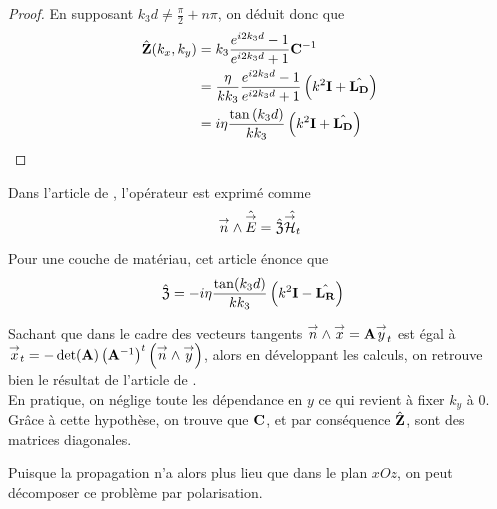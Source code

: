 \begin{proof}
            En supposant \(k_3d \not = \frac{\pi}{2} + n\pi\), on déduit donc que
            \begin{align}
                \hat {\mathbf{Z}}(k_x,k_y) &=  k_3 \dfrac{e^{i2k_3d} -1}{e^{i2k_3d} +1} \mathbf{C}^{-1}
                \\
                &= \dfrac{\eta}{kk_3} \dfrac{e^{i2k_3d} -1}{e^{i2k_3d} +1}\left(k^2\mathbf{I} + \hat{\mathbf{L_D}}\right)
                \\
                &= i\eta\dfrac{\tan\left(k_3d\right)}{kk_3}\left(k^2\mathbf{I} + \hat{\mathbf{L_D}}\right)
            \end{align}

        \end{proof}

        Dans l'article de \cite{marceaux_high-order_2000}, l'opérateur est exprimé comme
        \begin{equation}
            {\overset{\rightarrow}{n}} \wedge \hat{{\overset{\rightarrow}{E}}} = \hat{\mathfrak{Z}} \hat{{\overset{\rightarrow}{\mathcal{H}}}_t}
        \end{equation}

        Pour une couche de matériau, cet article énonce que 
        \begin{align}
            \hat{\mathfrak{Z}} &= -i\eta\dfrac{\tan(k_3d)}{kk_3}\left(k^2\mathbf{I} - \hat{\mathbf{L_R}}\right)
        \end{align}

        Sachant que dans le cadre des vecteurs tangents \({\overset{\rightarrow}{n}}\wedge {\overset{\rightarrow}{x}} = \mathbf{A} {\overset{\rightarrow}{y}}_t\) est égal à \({\overset{\rightarrow}{x}}_t = -\det(\mathbf{A})\left(\mathbf{A}^{-1}\right)^t\left({\overset{\rightarrow}{n}}\wedge{\overset{\rightarrow}{y}}\right)\), alors en développant les calculs, on retrouve bien le résultat de l'article de \cite{marceaux_high-order_2000}.\\


        En pratique, on néglige toute les dépendance en \(y\) ce qui revient à fixer \(k_y\) à \(0\). Grâce à cette hypothèse, on trouve que \(\mathbf{C}\), et par conséquence \(\hat {\mathbf{Z}}\), sont des matrices diagonales.

        Puisque la propagation n'a alors plus lieu que dans le plan \(xOz\), on peut décomposer ce problème par polarisation.

